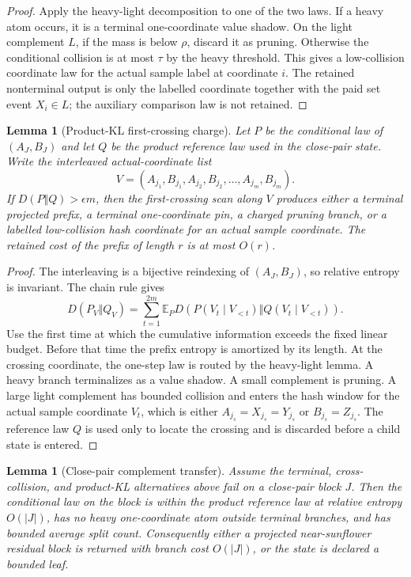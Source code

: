 \documentclass[11pt]{article}
\newtheorem{lemma}[theorem]{Lemma}
\theoremstyle{remark}
\newcommand{\E}{\mathbb E}
\begin{document}
\begin{proof}
Apply the heavy-light decomposition to one of the two laws.  If a heavy atom occurs, it is a terminal one-coordinate value shadow.  On the light complement $L$, if the mass is below $\rho$, discard it as pruning.  Otherwise the conditional collision is at most $\tau$ by the heavy threshold.  This gives a low-collision coordinate law for the actual sample label at coordinate $i$.  The retained nonterminal output is only the labelled coordinate together with the paid set event $X_i\in L$; the auxiliary comparison law is not retained.
\end{proof}

\begin{lemma}[Product-KL first-crossing charge]\label{lem:app-kl-first-crossing}
Let $P$ be the conditional law of $(A_J,B_J)$ and let $Q$ be the product reference law used in the close-pair state.  Write the interleaved actual-coordinate list
\[
        V=(A_{j_1},B_{j_1},A_{j_2},B_{j_2},\ldots,A_{j_m},B_{j_m}).
\]
If $D(P\Vert Q)>\epsilon m$, then the first-crossing scan along $V$ produces either a terminal projected prefix, a terminal one-coordinate pin, a charged pruning branch, or a labelled low-collision hash coordinate for an actual sample coordinate.  The retained cost of the prefix of length $r$ is at most $O(r)$.
\end{lemma}

\begin{proof}
The interleaving is a bijective reindexing of $(A_J,B_J)$, so relative entropy is invariant.  The chain rule gives
\[
        D(P_V\Vert Q_V)=\sum_{t=1}^{2m}\E_P D(P(V_t\mid V_{<t})\Vert Q(V_t\mid V_{<t})).
\]
Use the first time at which the cumulative information exceeds the fixed linear budget.  Before that time the prefix entropy is amortized by its length.  At the crossing coordinate, the one-step law is routed by the heavy-light lemma.  A heavy branch terminalizes as a value shadow.  A small complement is pruning.  A large light complement has bounded collision and enters the hash window for the actual sample coordinate $V_t$, which is either $A_{j_s}=X_{j_s}=Y_{j_s}$ or $B_{j_s}=Z_{j_s}$.  The reference law $Q$ is used only to locate the crossing and is discarded before a child state is entered.
\end{proof}

\begin{lemma}[Close-pair complement transfer]\label{lem:app-complement-transfer}
Assume the terminal, cross-collision, and product-KL alternatives above fail on a close-pair block $J$.  Then the conditional law on the block is within the product reference law at relative entropy $O(|J|)$, has no heavy one-coordinate atom outside terminal branches, and has bounded average split count.  Consequently either a projected near-sunflower residual block is returned with branch cost $O(|J|)$, or the state is declared a bounded leaf.
\end{lemma}
\end{document}
